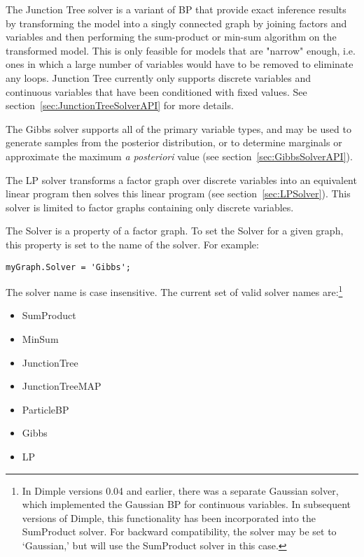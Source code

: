The Junction Tree solver is a variant of BP that provide exact inference results by transforming the model into a singly connected graph by joining factors and variables and then performing the sum-product or min-sum algorithm on the transformed model. This is only feasible for models that are "narrow" enough, i.e. ones in which a large number of variables would have to be removed to eliminate any loops. Junction Tree currently only supports discrete variables and continuous variables that have been conditioned with fixed values. See section~\ref{sec:JunctionTreeSolverAPI} for more details.

The Gibbs solver supports all of the primary variable types, and may be used to generate samples from the posterior distribution, or to determine marginals or approximate the maximum \emph{a posteriori} value (see section~\ref{sec:GibbsSolverAPI}).

The LP solver transforms a factor graph over discrete variables into an equivalent linear program then solves this linear program (see section~\ref{sec:LPSolver}).  This solver is limited to factor graphs containing only discrete variables.

The Solver is a property of a factor graph.  To set the Solver for a given graph, this property is set to the name of the solver.  For example:

\ifmatlab

\begin{lstlisting}
myGraph.Solver = 'Gibbs';
\end{lstlisting}

The solver name is case insensitive.  The current set of valid solver names are:\footnote{In Dimple versions 0.04 and earlier, there was a separate Gaussian solver, which implemented the Gaussian BP for continuous variables.  In subsequent versions of Dimple, this functionality has been incorporated into the SumProduct solver.  For backward compatibility, the solver may be set to `Gaussian,' but will use the SumProduct solver in this case.} 

\begin{itemize}
\item SumProduct
\item MinSum
\item JunctionTree
\item JunctionTreeMAP
\item ParticleBP
\item Gibbs
\item LP
\end{itemize}

